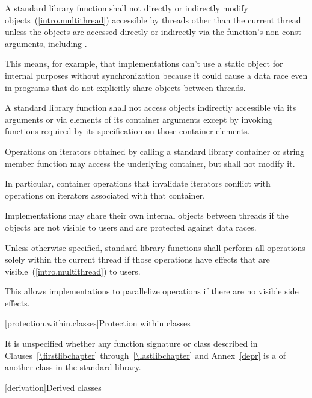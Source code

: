 \pnum
A \Cpp standard library function shall not directly or indirectly modify
objects~(\ref{intro.multithread}) accessible by threads other than the current thread
unless the objects are accessed directly or indirectly via the function's non-const
arguments, including .

\pnum
\begin{note} This means, for example, that implementations can't use a static object for
internal purposes without synchronization because it could cause a data race even in
programs that do not explicitly share objects between threads. \end{note}

\pnum
A \Cpp standard library function shall not access objects indirectly accessible via its
arguments or via elements of its container arguments except by invoking functions
required by its specification on those container elements.

\pnum
Operations on iterators obtained by calling a standard library container or string
member function may access the underlying container, but shall not modify it.
\begin{note} In particular, container operations that invalidate iterators conflict
with operations on iterators associated with that container. \end{note}

\pnum
Implementations may share their own internal objects between threads if the objects are
not visible to users and are protected against data races.

\pnum
Unless otherwise specified, \Cpp standard library functions shall perform all operations
solely within the current thread if those operations have effects that are
visible~(\ref{intro.multithread}) to users.

\pnum
\begin{note} This allows implementations to parallelize operations if there are no visible
%
side effects. \end{note}

[protection.within.classes]{Protection within classes}

\pnum
{}%
It is unspecified whether any function signature or class described in
Clauses~\ref{\firstlibchapter} through~\ref{\lastlibchapter} and Annex~\ref{depr} is a
of another class in the \Cpp standard library.

[derivation]{Derived classes}

